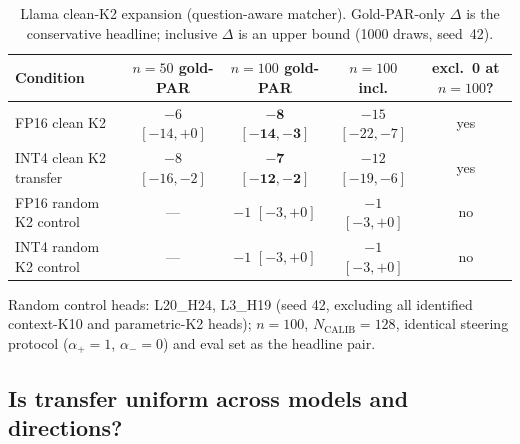 \documentclass{article} %
\begin{document}
\begin{table}[t]
\caption{Llama clean-K2 expansion (question-aware matcher). Gold-PAR-only $\Delta$ is the conservative headline; inclusive $\Delta$ is an upper bound (1000 draws, seed~42).}
\label{tab:parametric-n50-n100}
\centering
\scriptsize
\setlength{\tabcolsep}{2pt}
\begin{tabular}{lcccc}
\toprule
Condition & $n{=}50$ gold-PAR & $n{=}100$ gold-PAR & $n{=}100$ incl. & excl.\ 0 at $n{=}100$? \\
\midrule
FP16 clean K2 & $-6$ $[-14,+0]$ & $\mathbf{-8}$ $\mathbf{[-14,-3]}$ & $-15$ $[-22,-7]$ & yes \\
INT4 clean K2 transfer & $-8$ $[-16,-2]$ & $\mathbf{-7}$ $\mathbf{[-12,-2]}$ & $-12$ $[-19,-6]$ & yes \\
FP16 random K2 control & --- & $-1$ $[-3, +0]$ & $-1$ $[-3, +0]$ & no \\
INT4 random K2 control & --- & $-1$ $[-3, +0]$ & $-1$ $[-3, +0]$ & no \\
\bottomrule
\end{tabular}
\par\vspace{1pt}\raggedright\tiny Random control heads: L20\_H24, L3\_H19 (seed 42, excluding all identified context-K10 and parametric-K2 heads); $n{=}100$, $N_{\mathrm{CALIB}}{=}128$, identical steering protocol ($\alpha_{+}{=}1$, $\alpha_{-}{=}0$) and eval set as the headline pair.
\vspace{-4pt}
\end{table}

\subsection{Is transfer uniform across models and directions?}
\label{sec:model2}
\end{document}
